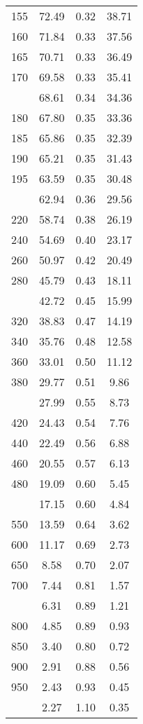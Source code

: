 \begin{table}[ht]
\begin{tabular}{lccc}
  155 & 72.49 & 0.32 & 38.71 \\ 
  160 & 71.84 & 0.33 & 37.56 \\ 
  165 & 70.71 & 0.33 & 36.49 \\ 
  170 & 69.58 & 0.33 & 35.41 \\ 
   \addlinespace
175 & 68.61 & 0.34 & 34.36 \\ 
  180 & 67.80 & 0.35 & 33.36 \\ 
  185 & 65.86 & 0.35 & 32.39 \\ 
  190 & 65.21 & 0.35 & 31.43 \\ 
  195 & 63.59 & 0.35 & 30.48 \\ 
   \addlinespace
200 & 62.94 & 0.36 & 29.56 \\ 
  220 & 58.74 & 0.38 & 26.19 \\ 
  240 & 54.69 & 0.40 & 23.17 \\ 
  260 & 50.97 & 0.42 & 20.49 \\ 
  280 & 45.79 & 0.43 & 18.11 \\ 
   \addlinespace
300 & 42.72 & 0.45 & 15.99 \\ 
  320 & 38.83 & 0.47 & 14.19 \\ 
  340 & 35.76 & 0.48 & 12.58 \\ 
  360 & 33.01 & 0.50 & 11.12 \\ 
  380 & 29.77 & 0.51 & 9.86 \\ 
   \addlinespace
400 & 27.99 & 0.55 & 8.73 \\ 
  420 & 24.43 & 0.54 & 7.76 \\ 
  440 & 22.49 & 0.56 & 6.88 \\ 
  460 & 20.55 & 0.57 & 6.13 \\ 
  480 & 19.09 & 0.60 & 5.45 \\ 
   \addlinespace
500 & 17.15 & 0.60 & 4.84 \\ 
  550 & 13.59 & 0.64 & 3.62 \\ 
  600 & 11.17 & 0.69 & 2.73 \\ 
  650 & 8.58 & 0.70 & 2.07 \\ 
  700 & 7.44 & 0.81 & 1.57 \\ 
   \addlinespace
750 & 6.31 & 0.89 & 1.21 \\ 
  800 & 4.85 & 0.89 & 0.93 \\ 
  850 & 3.40 & 0.80 & 0.72 \\ 
  900 & 2.91 & 0.88 & 0.56 \\ 
  950 & 2.43 & 0.93 & 0.45 \\ 
   \addlinespace
1000 & 2.27 & 1.10 & 0.35 \\ 
   \bottomrule
\end{tabular}
\end{table}
